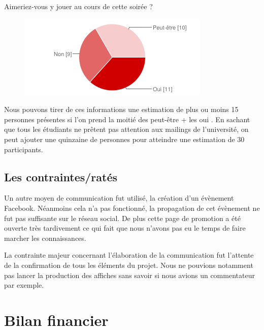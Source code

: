 Aimeriez-vous y jouer au cours de cette soirée ?

\begin{figure}
  \begin{center}
    \includegraphics[scale=1.57]{images/chart_3.png}
    \caption{}
    \label{flow}
  \end{center}
\end{figure}

Nous pouvons tirer de ces informations une estimation de plus ou moins 15 personnes présentes si l’on prend
la moitié des \og peut-être \fg{} + les \og oui \fg{}.
En sachant que tous les étudiants ne prêtent pas attention aux mailings de l’université, on peut ajouter
une quinzaine de personnes pour atteindre une estimation de 30 participants.

\subsection{Les contraintes/ratés}%
\label{sub:les_contraintes_rates}

Un autre moyen de communication fut utilisé, la création d'un évènement
Facebook. Néanmoins cela n'a pas fonctionné, la propagation de cet
évènement ne fut pas suffisante sur le réseau social. De plus cette page
de promotion a été ouverte très tardivement ce qui fait que nous
n'avons pas eu le temps de faire marcher les connaissances.

La contrainte majeur concernant l'élaboration de la communication fut l'attente
de la confirmation de tous les éléments du projet.  Nous ne pouvions
notamment pas lancer la production des affiches sans savoir si nous
avions un commentateur par exemple.


\section{Bilan financier}%
\label{sec:bilan_financier}

